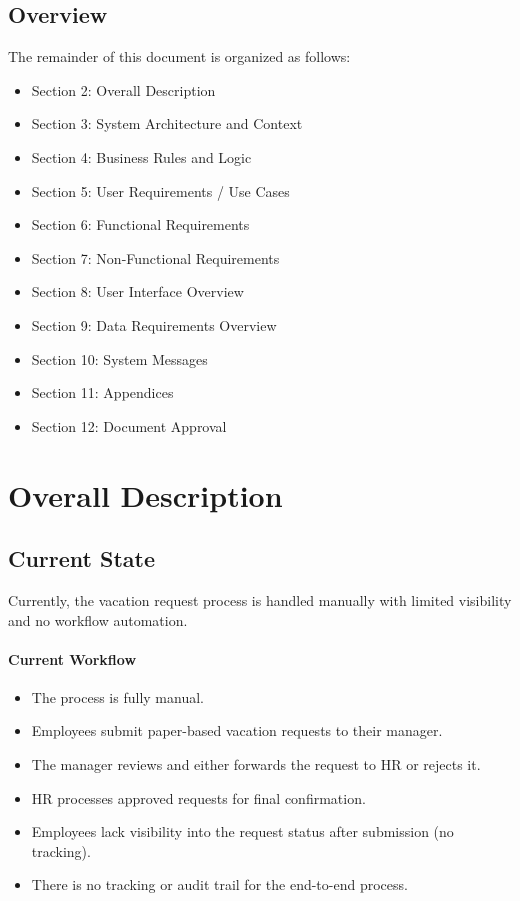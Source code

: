\documentclass[12pt,a4paper]{article}
\begin{document}
\subsection{Overview}
The remainder of this document is organized as follows:
\begin{itemize}
    \item Section 2: Overall Description
    \item Section 3: System Architecture and Context
    \item Section 4: Business Rules and Logic
    \item Section 5: User Requirements / Use Cases
    \item Section 6: Functional Requirements
    \item Section 7: Non-Functional Requirements
    \item Section 8: User Interface Overview
    \item Section 9: Data Requirements Overview
    \item Section 10: System Messages
    \item Section 11: Appendices
    \item Section 12: Document Approval
\end{itemize}

\section{Overall Description}

\subsection{Current State}
Currently, the vacation request process is handled manually with limited visibility and no workflow automation.

\paragraph{Current Workflow}
\begin{itemize}
    \item The process is fully manual.
    \item Employees submit paper-based vacation requests to their manager.
    \item The manager reviews and either forwards the request to HR or rejects it.
    \item HR processes approved requests for final confirmation.
    \item Employees lack visibility into the request status after submission (no tracking).
    \item There is no tracking or audit trail for the end-to-end process.
\end{itemize}
\end{document}

